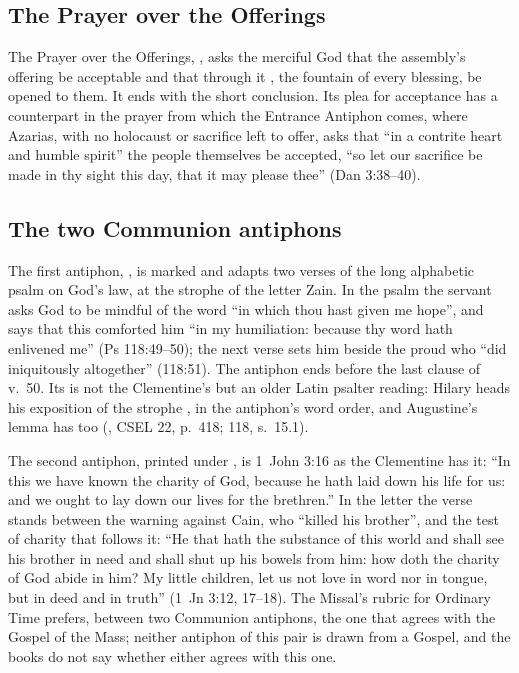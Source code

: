 \subsection{The Prayer over the Offerings}

The Prayer over the Offerings, , asks the
merciful God that the assembly's offering be acceptable and that through it
, the fountain of every blessing, be opened to
them. It ends with the short conclusion. Its plea for acceptance has a
counterpart in the prayer from which the Entrance Antiphon comes, where
Azarias, with no holocaust or sacrifice left to offer, asks that ``in a
contrite heart and humble spirit'' the people themselves be accepted, ``so let
our sacrifice be made in thy sight this day, that it may please thee'' (Dan
3:38--40).

\subsection{The two Communion antiphons}

The first antiphon, , is marked
 and adapts two verses of the long alphabetic psalm on God's law, at
the strophe of the letter Zain. In the psalm the servant asks God to be mindful
of the word ``in which thou hast given me hope'', and says that this comforted
him ``in my humiliation: because thy word hath enlivened me'' (Ps 118:49--50);
the next verse sets him beside the proud who ``did iniquitously altogether''
(118:51). The antiphon ends before the last clause of v.~50. Its
 is not the Clementine's  but an older Latin
psalter reading: Hilary heads his exposition of the strophe , in the antiphon's word order,
and Augustine's lemma has  too (,
CSEL 22, p.~418;  118, s.~15.1).

The second antiphon, printed under , is 1~John 3:16 as the
Clementine has it: ``In this we have known the charity of God, because he hath
laid down his life for us: and we ought to lay down our lives for the
brethren.'' In the letter the verse stands between the warning against Cain,
who ``killed his brother'', and the test of charity that follows it: ``He that
hath the substance of this world and shall see his brother in need and shall
shut up his bowels from him: how doth the charity of God abide in him? My
little children, let us not love in word nor in tongue, but in deed and in
truth'' (1~Jn 3:12, 17--18). The Missal's rubric for Ordinary Time prefers,
between two Communion antiphons, the one that agrees with the Gospel of the
Mass; neither antiphon of this pair is drawn from a Gospel, and the books do
not say whether either agrees with this one.

